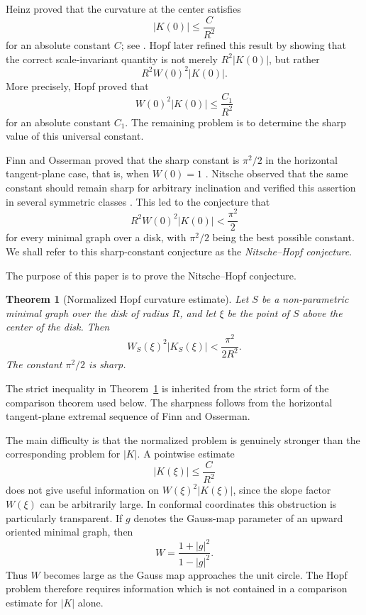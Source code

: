 \documentclass[11pt]{amsart}
\newtheorem{theorem}{Theorem}[section]
\theoremstyle{remark}
\numberwithin{equation}{section}
\begin{document}
Heinz proved that the curvature at the center satisfies
\[
        |K(0)|\leq \frac{C}{R^2}
\]
for an absolute constant \(C\); see \cite{Heinz1952}.  Hopf later refined this result by showing that the
correct scale-invariant quantity is not merely \(R^2|K(0)|\), but rather
\[
        R^2W(0)^2|K(0)|.
\]
More precisely, Hopf proved \cite{Hopf1953} that
\[
        W(0)^2|K(0)|\leq \frac{C_1}{R^2}
\]
for an absolute constant \(C_1\).  The remaining problem is to determine the sharp value of this universal
constant.

Finn and Osserman proved that the sharp constant is \(\pi^2/2\) in the
horizontal tangent-plane case, that is, when \(W(0)=1\)
\cite{FinnOsserman1964}.  Nitsche observed that the same constant should
remain sharp for arbitrary inclination and verified this assertion in several
symmetric classes \cite{Nitsche1973}.  This led to the conjecture that
\[
        R^2W(0)^2|K(0)|<\frac{\pi^2}{2}
\]
for every minimal graph over a disk, with \(\pi^2/2\) being the best possible
constant.  We shall refer to this sharp-constant conjecture as the
{\it Nitsche--Hopf conjecture}.

The purpose of this paper is to prove the Nitsche--Hopf conjecture.

\begin{theorem}[Normalized Hopf curvature estimate]\label{thm:main}
Let \(S\) be a non-parametric minimal graph over the disk of radius \(R\),
and let \(\xi\) be the point of \(S\) above the center of the disk.  Then
\[
        W_S(\xi)^2 |K_S(\xi)|<\frac{\pi^2}{2R^2}.
\]
The constant \(\pi^2/2\) is sharp.
\end{theorem}

The strict inequality in Theorem~\ref{thm:main} is inherited from the strict
form of the comparison theorem used below.  The sharpness follows from the
horizontal tangent-plane extremal sequence of Finn and Osserman.

The main difficulty is that the normalized problem is genuinely stronger
than the corresponding problem for \(|K|\).  A pointwise estimate
\[
        |K(\xi)|\leq \frac{C}{R^2}
\]
does not give useful information on \(W(\xi)^2|K(\xi)|\), since the slope
factor \(W(\xi)\) can be arbitrarily large.  In conformal coordinates this
obstruction is particularly transparent.  If \(g\) denotes the Gauss-map
parameter of an upward oriented minimal graph, then
\[
        W=\frac{1+|g|^2}{1-|g|^2}.
\]
Thus \(W\) becomes large as the Gauss map approaches the unit circle.  The
Hopf problem therefore requires information which is not contained in a
comparison estimate for \(|K|\) alone.
\end{document}
